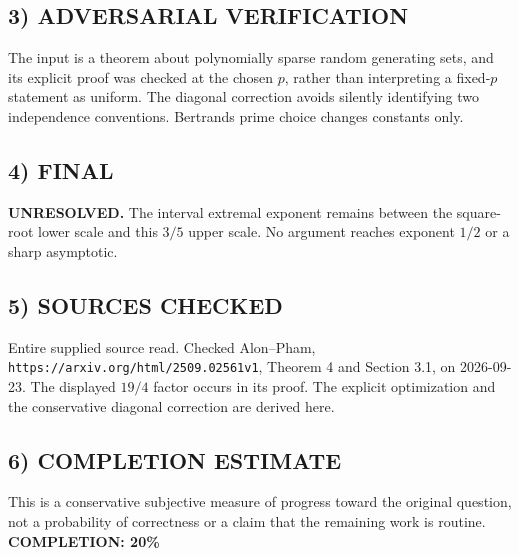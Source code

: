 \subsection{3) ADVERSARIAL VERIFICATION}
The input is a theorem about polynomially sparse random generating sets, and its explicit proof was checked at the chosen $p$, rather than interpreting a fixed-$p$ statement as uniform. The diagonal correction avoids silently identifying two independence conventions. Bertrand\textquotesingle s prime choice changes constants only.
\subsection{4) FINAL}
\textbf{UNRESOLVED.}
The interval extremal exponent remains between the square-root lower scale and this $3/5$ upper scale. No argument reaches exponent $1/2$ or a sharp asymptotic.
\subsection{5) SOURCES CHECKED}
Entire supplied source read. Checked Alon--Pham, \texttt{https://arxiv.org/html/2509.02561v1}, Theorem 4 and Section 3.1, on 2026-09-23. The displayed $19/4$ factor occurs in its proof. The explicit optimization and the conservative diagonal correction are derived here.
\subsection{6) COMPLETION ESTIMATE}
This is a conservative subjective measure of progress toward the original question, not a probability of correctness or a claim that the remaining work is routine.
\textbf{COMPLETION: 20\%}
